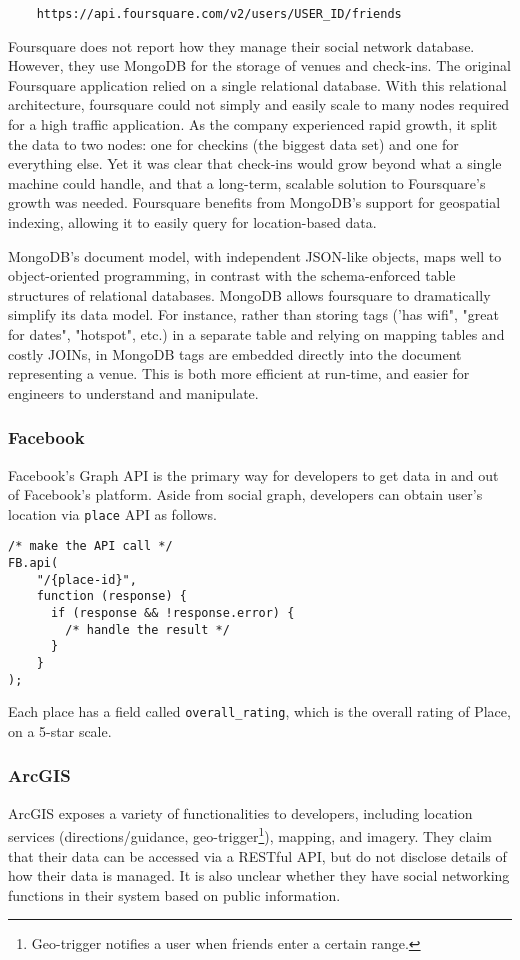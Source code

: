 \begin{verbatim}
	https://api.foursquare.com/v2/users/USER_ID/friends
\end{verbatim}

Foursquare does not report how they manage their social network database. However, they use MongoDB for the storage of venues and check-ins\cite{4qrmongo}. The original Foursquare application relied on a single relational database. With this relational architecture, foursquare could not simply and easily scale to many nodes required for a high traffic application. As the company experienced rapid growth, it split the data to two nodes: one for checkins (the biggest data set) and one for everything else. Yet it was clear that check-ins would grow beyond what a single machine could handle, and that a long-term, scalable solution to Foursquare's growth was needed. Foursquare benefits from MongoDB’s support for geospatial indexing, allowing it to easily query for location-based data. 

MongoDB's document model, with independent JSON-like objects, maps well to object-oriented programming, in contrast with the schema-enforced table structures of relational databases. MongoDB allows foursquare to dramatically simplify its data model. For instance, rather than storing tags ('has wifi", "great for dates", "hotspot", etc.) in a separate table and relying on mapping tables and costly JOINs, in MongoDB tags are embedded directly into the document representing a venue. This is both more efficient at run-time, and easier for engineers to understand and manipulate.

\subsubsection{Facebook}
Facebook's Graph API is the primary way for developers to get data in and out of Facebook's platform. Aside from social graph, developers can obtain user's location via \texttt{place} API as follows.

\begin{verbatim}
/* make the API call */
FB.api(
    "/{place-id}",
    function (response) {
      if (response && !response.error) {
        /* handle the result */
      }
    }
);
\end{verbatim}

Each place has a field called \texttt{overall\_rating}, which is the overall rating of Place, on a 5-star scale.

\subsubsection{ArcGIS}
ArcGIS\cite{arcgis} exposes a variety of functionalities to developers, including location services (directions/guidance, geo-trigger\footnote{Geo-trigger notifies a user when friends enter a certain range.}), mapping, and imagery. They claim that their data can be accessed via a RESTful API, but do not disclose details of how their data is managed. It is also unclear whether they have social networking functions in their system based on public information.

